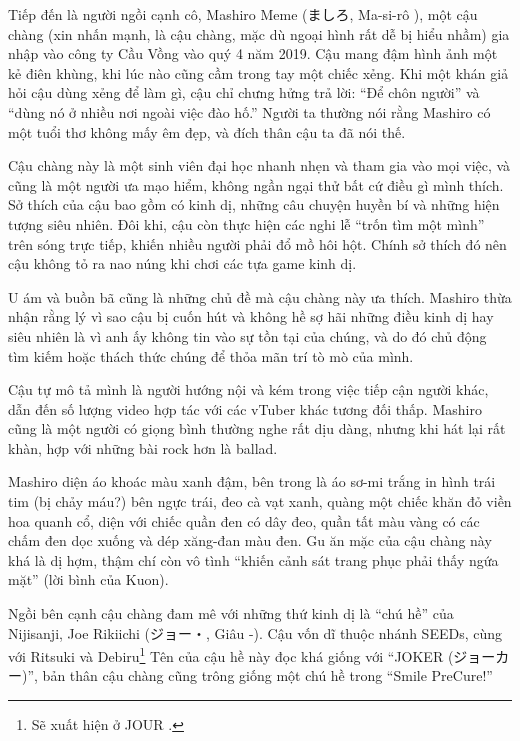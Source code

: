 \documentclass[../main.tex]{subfiles}
\begin{document}

Tiếp đến là người ngồi cạnh cô, Mashiro Meme (ましろ, Ma-si-rô ), một cậu chàng (xin nhấn mạnh, là cậu chàng, mặc dù ngoại hình rất dễ bị hiểu nhầm) gia nhập vào công ty Cầu Vồng vào quý 4 năm 2019. Cậu mang đậm hình ảnh một kẻ điên khùng, khi lúc nào cũng cầm trong tay một chiếc xẻng. Khi một khán giả hỏi cậu dùng xẻng để làm gì, cậu chỉ chưng hửng trả lời: ``Để chôn người'' và ``dùng nó ở nhiều nơi ngoài việc đào hố.'' Người ta thường nói rằng Mashiro có một tuổi thơ không mấy êm đẹp, và đích thân cậu ta đã nói thế.

Cậu chàng này là một sinh viên đại học nhanh nhẹn và tham gia vào mọi việc, và cũng là một người ưa mạo hiểm, không ngần ngại thử bất cứ điều gì mình thích. Sở thích của cậu bao gồm có kinh dị, những câu chuyện huyền bí và những hiện tượng siêu nhiên. Đôi khi, cậu còn thực hiện các nghi lễ ``trốn tìm một mình'' trên sóng trực tiếp, khiến nhiều người phải đổ mồ hôi hột. Chính sở thích đó nên cậu không tỏ ra nao núng khi chơi các tựa game kinh dị.

U ám và buồn bã cũng là những chủ đề mà cậu chàng này ưa thích. Mashiro thừa nhận rằng lý vì sao cậu bị cuốn hút và không hề sợ hãi những điều kinh dị hay siêu nhiên là vì anh ấy không tin vào sự tồn tại của chúng, và do đó chủ động tìm kiếm hoặc thách thức chúng để thỏa mãn trí tò mò của mình.

Cậu tự mô tả mình là người hướng nội và kém trong việc tiếp cận người khác, dẫn đến số lượng video hợp tác với các vTuber khác tương đối thấp. Mashiro cũng là một người có giọng bình thường nghe rất dịu dàng, nhưng khi hát lại rất khàn, hợp với những bài rock hơn là ballad.

Mashiro diện áo khoác màu xanh đậm, bên trong là áo sơ-mi trắng in hình trái tim (bị chảy máu?) bên ngực trái, đeo cà vạt xanh, quàng một chiếc khăn đỏ viền hoa quanh cổ, diện với chiếc quần đen có dây đeo, quần tất màu vàng có các chấm đen dọc xuống và dép xăng-đan màu đen. Gu ăn mặc của cậu chàng này khá là dị hợm, thậm chí còn vô tình ``khiến cảnh sát trang phục phải thấy ngứa mặt'' (lời bình của Kuon).


Ngồi bên cạnh cậu chàng đam mê với những thứ kinh dị là ``chú hề'' của Nijisanji, Joe Rikiichi (ジョー・, Giâu -). Cậu vốn dĩ thuộc nhánh SEEDs, cùng với Ritsuki và Debiru\footnote{Sẽ xuất hiện ở {\flaregothic JOUR }.} Tên của cậu hề này đọc khá giống với ``{\sen JOKER} (ジョーカー)'', bản thân cậu chàng cũng trông giống một chú hề trong ``Smile PreCure!''
\end{document}
